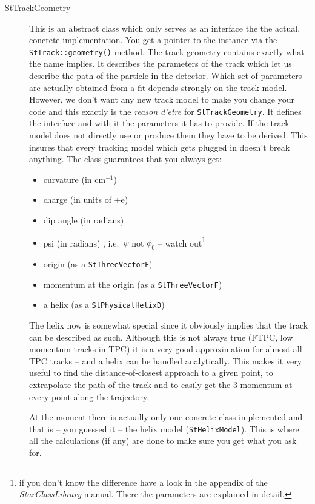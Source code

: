 \documentclass[twoside]{article}
\newcommand{\name}[1]{\textsl{#1}}%
\begin{document}
\begin{description}
\item[StTrackGeometry]  This is an abstract
    class which only serves as an interface the the actual, concrete
    implementation. You get a pointer to the instance via the
    \texttt{StTrack::geometry()} method. The track geometry contains
    exactly what the name implies.  It describes the parameters of the
    track which let us describe the path of the particle in the
    detector. Which set of parameters are actually obtained from a fit
    depends strongly on the track model.  However, we don't want any
    new track model to make you change your code and this exactly is
    the \textit{reason d'etre} for \texttt{StTrackGeometry}. It
    defines the interface and with it the parameters it has to
    provide. If the track model does not directly use or produce them
    they have to be derived. This insures that every tracking model
    which gets plugged in doesn't break anything. The class guarantees
    that you always get:
    \begin{itemize}
    \item curvature (in cm$^{-1}$)
    \item charge (in units of +e)
    \item dip angle (in radians)
    \item psi (in radians) , i.e.~$\psi$ not $\phi_0$ -- watch
        out\footnote{if you don't know the difference have a look in
            the appendix of the \name{StarClassLibrary} manual.  There
            the parameters are explained in detail.}
    \item origin (as a \texttt{StThreeVectorF})
    \item momentum at the origin (as a \texttt{StThreeVectorF})
    \item a helix (as a \texttt{StPhysicalHelixD})
    \end{itemize}
    The helix now is somewhat special since it obviously implies that
    the track can be described as such. Although this is not always
    true (FTPC, low momentum tracks in TPC) it is a very good
    approximation for almost all TPC tracks -- and a helix can be
    handled analytically. This makes it very useful to find the
    distance-of-closest approach to a given point, to extrapolate the
    path of the track and to easily get the 3-momentum at every point
    along the trajectory.
    
    At the moment there is actually only one concrete class
    implemented and that is -- you guessed it -- the helix model
    (\texttt{StHelixModel}). This is where all the calculations (if
    any) are done to make sure you get what you ask for.
    

\end{description}
\end{document}
